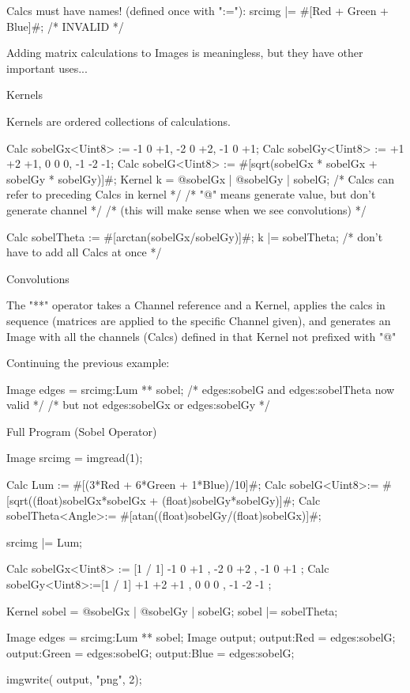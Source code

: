 Calcs must have names! (defined once with ":="):
srcimg |= #[Red + Green + Blue]#; /* INVALID */

Adding matrix calculations to Images is meaningless,
but they have other important uses...

Kernels

Kernels are ordered collections of calculations.

Calc sobelGx<Uint8> := {-1 0 +1, -2 0 +2, -1 0 +1};
Calc sobelGy<Uint8> := {+1 +2 +1, 0 0 0, -1 -2 -1};
Calc sobelG<Uint8> := 
    #[sqrt(sobelGx * sobelGx + sobelGy * sobelGy)]#;
Kernel k = @sobelGx | @sobelGy | sobelG;
/* Calcs can refer to preceding Calcs in kernel */
/* "@" means generate value, but don't generate channel */
/* (this will make sense when we see convolutions) */

Calc sobelTheta := #[arctan(sobelGx/sobelGy)]#;
k |= sobelTheta; 
/* don't have to add all Calcs at once */

Convolutions

The "**" operator takes a Channel reference and a Kernel,
applies the calcs in sequence (matrices are applied to the specific Channel given),
and generates an Image with all the channels (Calcs) defined in that Kernel not prefixed with "@"

Continuing the previous example:

Image edges = srcimg:Lum ** sobel;
/* edges:sobelG and edges:sobelTheta now valid */
/* but not edges:sobelGx or edges:sobelGy */

Full Program (Sobel Operator)

Image srcimg = imgread(1);

Calc Lum := #[(3*Red + 6*Green + 1*Blue)/10]#;
Calc sobelG<Uint8>:= #[sqrt((float)sobelGx*sobelGx + (float)sobelGy*sobelGy)]#;
Calc sobelTheta<Angle>:= #[atan((float)sobelGy/(float)sobelGx)]#;

srcimg |= Lum;

Calc sobelGx<Uint8> := [1 / 1]{ -1  0 +1 , -2  0 +2 , -1  0 +1 };
Calc sobelGy<Uint8>:=[1 / 1]{ +1 +2 +1 ,  0  0  0 , -1 -2 -1 };

Kernel sobel = @sobelGx | @sobelGy | sobelG;
sobel |= sobelTheta;

Image edges = srcimg:Lum ** sobel;
Image output;
output:Red   = edges:sobelG;
output:Green = edges:sobelG;
output:Blue  = edges:sobelG;

imgwrite( output, "png", 2);
